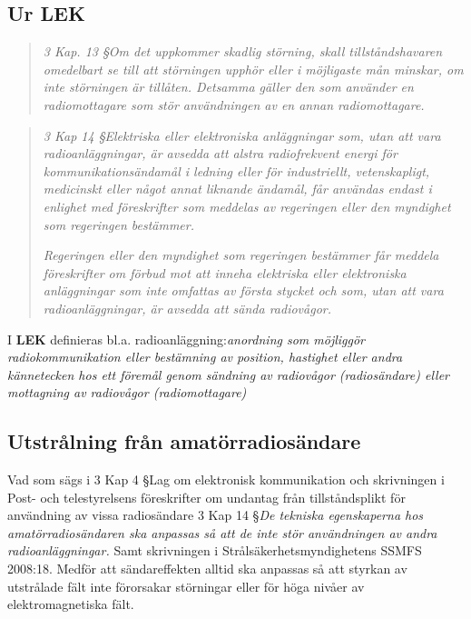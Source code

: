 \subsection{Ur LEK}

\begin{quote}
\emph{3 Kap. 13 \S Om det uppkommer skadlig störning, skall tillståndshavaren
omedelbart se till att störningen upphör eller i möjligaste mån minskar, om
inte störningen är tillåten. Detsamma gäller den som använder en
radiomottagare som stör användningen av en annan radiomottagare.}
\end{quote}

\begin{quote}
\emph{3 Kap 14 \S Elektriska eller elektroniska anläggningar som, utan att vara
radioanläggningar, är avsedda att alstra radiofrekvent energi för
kommunikationsändamål i ledning eller för industriellt, vetenskapligt,
medicinskt eller något annat liknande ändamål, får användas endast i enlighet
med föreskrifter som meddelas av regeringen eller den myndighet som regeringen
bestämmer.}

\emph{Regeringen eller den myndighet som regeringen bestämmer får meddela
föreskrifter om förbud mot att inneha elektriska eller elektroniska
anläggningar som inte omfattas av första stycket och som, utan att vara
radioanläggningar, är avsedda att sända radiovågor.}
\end{quote}

I \textbf{LEK} definieras bl.a. radioanläggning:\emph{anordning som möjliggör
radiokommunikation eller bestämning av position, hastighet eller andra
kännetecken hos ett föremål genom sändning av radiovågor (radiosändare) eller
mottagning av radiovågor (radiomottagare)}

\subsection{Utstrålning från amatörradiosändare}

Vad som sägs i 3 Kap 4 \S Lag om elektronisk kommunikation och skrivningen i
Post- och telestyrelsens föreskrifter om undantag från tillståndsplikt för
användning av vissa radiosändare 3 Kap 14 \S \emph{De tekniska egenskaperna hos
amatörradiosändaren ska anpassas så att de inte stör användningen av andra
radioanläggningar.} Samt skrivningen i Strålsäkerhetsmyndighetens SSMFS 2008:18.
Medför att sändareffekten alltid ska anpassas så att styrkan av utstrålade
fält inte förorsakar störningar eller för höga nivåer av elektromagnetiska fält.

